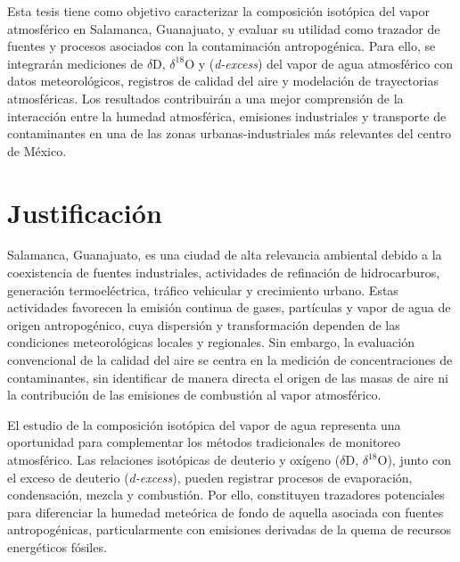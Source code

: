 Esta tesis tiene como objetivo caracterizar la composición isotópica del vapor 
atmosférico en Salamanca, Guanajuato, y evaluar su utilidad como trazador de fuentes y 
procesos asociados con la contaminación antropogénica. Para ello, se integrarán 
mediciones de $\delta$D, $\delta^{18}$O y (\textit{d-excess}) del vapor de agua atmosférico 
con datos meteorológicos,
registros de calidad del aire y modelación de trayectorias atmosféricas. Los resultados 
contribuirán a una mejor comprensión de la interacción entre la humedad atmosférica, emisiones 
industriales y transporte de contaminantes en una de las zonas urbanas-industriales 
más relevantes del centro de México.

\section{Justificación}

Salamanca, Guanajuato, es una ciudad de alta relevancia ambiental debido a 
la coexistencia de fuentes industriales, actividades de refinación de hidrocarburos, 
generación termoeléctrica, tráfico vehicular y crecimiento urbano. Estas actividades 
favorecen la emisión continua de gases, partículas y vapor de agua de origen antropogénico, 
cuya dispersión y transformación dependen de las condiciones meteorológicas locales y 
regionales. Sin embargo, la evaluación convencional de la calidad del aire se centra 
en la medición de concentraciones de contaminantes, sin identificar de 
manera directa el origen de las masas de aire ni la contribución de las emisiones de 
combustión al vapor atmosférico.

El estudio de la composición isotópica del vapor de agua representa una oportunidad 
para complementar los métodos tradicionales de monitoreo atmosférico. Las relaciones 
isotópicas de deuterio y oxígeno ($\delta$D, $\delta^{18}$O), junto con el exceso 
de deuterio (\textit{d-excess}), pueden registrar procesos de evaporación, condensación,
mezcla y combustión. Por ello, constituyen trazadores potenciales para diferenciar la 
humedad meteórica de fondo de aquella asociada con fuentes antropogénicas, 
particularmente con emisiones derivadas de la quema de recursos energéticos fósiles.

